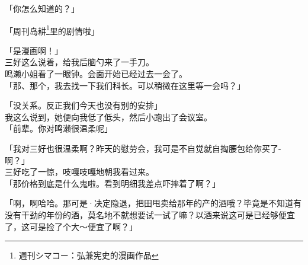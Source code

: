 「你怎么知道的？」

「周刊岛耕\footnote{週刊シマコー：弘兼宪史的漫画作品}里的剧情啦」

「是漫画啊！」\\

三好这么说着，给我后脑勺来了一手刀。\\

鸣濑小姐看了一眼钟。会面开始已经过去一会了。\\

「那、那个，我去找一下我们科长。可以稍微在这里等一会吗？」

「没关系。反正我们今天也没有别的安排」\\

我这么说到，她便向我低了低头，然后小跑出了会议室。\\

「前辈。你对鸣濑很温柔呢」

「我对三好也很温柔啊？昨天的慰劳会，我可是不自觉就自掏腰包给你买了-啊？」\\

三好吃了一惊，吱嘎吱嘎地朝我看过来。\\

「那价格到底是什么鬼啦。看到明细我差点吓摔着了啊？」

「啊，啊哈哈。那可是·决定隐退，把田甩卖给那年的产的酒哦？毕竟是不知道有没有干劲的年份的酒，莫名地不就想要试一试了嘛？以酒来说这可是已经够便宜了，这可是捡了个大～便宜了啊？」

